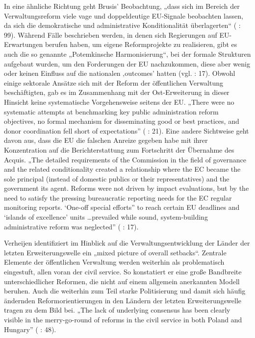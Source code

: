 In eine ähnliche Richtung geht Brusis’ Beobachtung, „dass sich im Bereich der Verwaltungsreform viele vage und doppeldeutige EU-Signale beobachten lassen, da sich die demokratische und administrative Konditionalität überlagerten“ (\cite{brusis09} : 99). Während Fälle beschrieben werden, in denen sich Regierungen auf EU-Erwartungen berufen haben, um eigene Reformprojekte zu realisieren, gibt es auch die so genannte „Potemkinsche Harmonisierung“, bei der formale Strukturen aufgebaut wurden, um den Forderungen der EU nachzukommen, diese aber wenig oder keinen Einfluss auf die nationalen ‚outcomes’ hatten (vgl. \cite{schsed05a} : 17). Obwohl einige sektorale Ansätze sich mit der Reform der öffentlichen Verwaltung beschäftigten, gab es im Zusammenhang mit der Ost-Erweiterung in dieser Hinsicht keine systematische Vorgehensweise seitens der EU. „There were no systematic attempts at benchmarking key public administration reform objectives, no formal mechanism for disseminating good or best practices, and donor coordination fell short of expectations” (\cite{summa} : 21). Eine andere Sichtweise geht davon aus, dass die EU die falschen Anreize gegeben habe mit ihrer Konzentration auf die Berichterstattung zum Fortschritt der Übernahme des Acquis. „The detailed requirements of the Commission in the field of governance and the related conditionality created a relationship where the EC became the sole principal (instead of domestic publics or their representatives) and the government its agent. Reforms were not driven by impact evaluations, but by the need to satisfy the pressing bureaucratic reporting needs for the EC regular monitoring reports. ‘One-off special efforts” to reach certain EU deadlines and ‘islands of excellence’ units …prevailed while sound, system-building administrative reform was neglected” (\cite{mungiu} : 17). \par

Verheijen identifiziert im Hinblick auf die Verwaltungsentwicklung der Länder der letzten Erweiterungswelle ein „mixed picture of overall setbacks“. Zentrale Elemente der öffentlichen Verwaltung werden weiterhin als problematisch eingestuft, allen voran der civil service. So konstatiert er eine große Bandbreite unterschiedlicher Reformen, die nicht auf einem allgemein anerkannten Modell beruhen. Auch die weiterhin zum Teil starke Politisierung und damit sich häufig ändernden Reformorientierungen in den Ländern der letzten Erweiterungswelle tragen zu dem Bild bei. „The lack of underlying consensus has been clearly visible in the merry-go-round of reforms in the civil service in both Poland and Hungary” (\cite{verheijen06} : 48). \par

